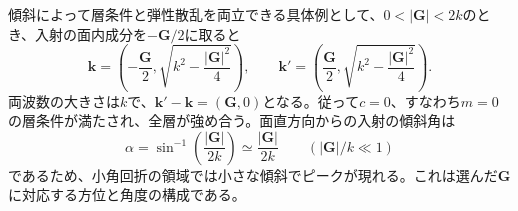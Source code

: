 \documentclass[11pt,a4paper]{article}
\begin{document}
傾斜によって層条件と弾性散乱を両立できる具体例として、$0<|\boldsymbol G|<2k$のとき、入射の面内成分を$-\boldsymbol G/2$に取ると
\begin{equation}
 \boldsymbol k=\left(-\frac{\boldsymbol G}{2},\sqrt{k^2-\frac{|\boldsymbol G|^2}{4}}\right),\qquad
 \boldsymbol k'=\left(\frac{\boldsymbol G}{2},\sqrt{k^2-\frac{|\boldsymbol G|^2}{4}}\right).
\end{equation}
両波数の大きさは$k$で、$\boldsymbol k'-\boldsymbol k=(\boldsymbol G,0)$となる。従って$c=0$、すなわち$m=0$の層条件が満たされ、全層が強め合う。面直方向からの入射の傾斜角は
\begin{equation}
 \alpha=\sin^{-1}\!\left(\frac{|\boldsymbol G|}{2k}\right)
 \simeq\frac{|\boldsymbol G|}{2k}\qquad (|\boldsymbol G|/k\ll1)
\end{equation}
であるため、小角回折の領域では小さな傾斜でピークが現れる。これは選んだ$\boldsymbol G$に対応する方位と角度の構成である。
\end{document}
